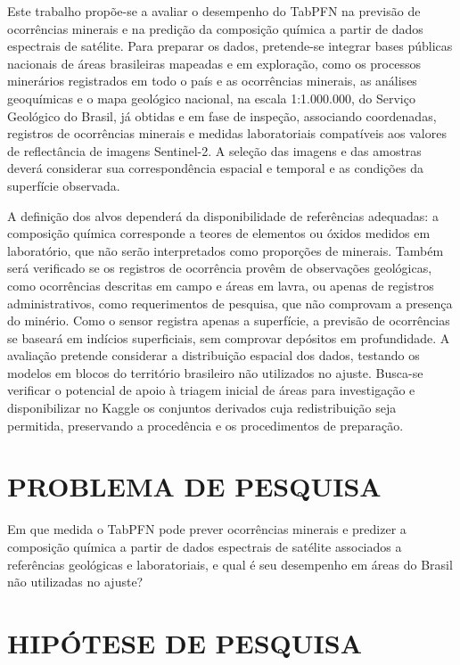 Este trabalho propõe-se a avaliar o desempenho do TabPFN na previsão de ocorrências minerais e na predição da composição química a partir de dados espectrais de satélite. Para preparar os dados, pretende-se integrar bases públicas nacionais de áreas brasileiras mapeadas e em exploração, como os processos minerários registrados em todo o país e as ocorrências minerais, as análises geoquímicas e o mapa geológico nacional, na escala 1:1.000.000, do Serviço Geológico do Brasil, já obtidas e em fase de inspeção, associando coordenadas, registros de ocorrências minerais e medidas laboratoriais compatíveis aos valores de reflectância de imagens Sentinel-2. A seleção das imagens e das amostras deverá considerar sua correspondência espacial e temporal e as condições da superfície observada.

A definição dos alvos dependerá da disponibilidade de referências adequadas: a composição química corresponde a teores de elementos ou óxidos medidos em laboratório, que não serão interpretados como proporções de minerais. Também será verificado se os registros de ocorrência provêm de observações geológicas, como ocorrências descritas em campo e áreas em lavra, ou apenas de registros administrativos, como requerimentos de pesquisa, que não comprovam a presença do minério. Como o sensor registra apenas a superfície, a previsão de ocorrências se baseará em indícios superficiais, sem comprovar depósitos em profundidade. A avaliação pretende considerar a distribuição espacial dos dados, testando os modelos em blocos do território brasileiro não utilizados no ajuste. Busca-se verificar o potencial de apoio à triagem inicial de áreas para investigação e disponibilizar no Kaggle os conjuntos derivados cuja redistribuição seja permitida, preservando a procedência e os procedimentos de preparação.

\section{PROBLEMA DE PESQUISA}

Em que medida o TabPFN pode prever ocorrências minerais e predizer a composição química a partir de dados espectrais de satélite associados a referências geológicas e laboratoriais, e qual é seu desempenho em áreas do Brasil não utilizadas no ajuste?

\section{HIPÓTESE DE PESQUISA}

